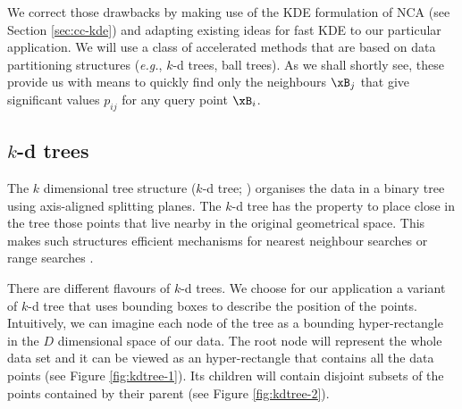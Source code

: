 We correct those drawbacks by making use of the KDE formulation of NCA (see
Section \ref{sec:cc-kde}) and adapting existing ideas for fast KDE
\citep{deng1995,gray2003} to our particular application. We will use a class of
accelerated methods that are based on data partitioning structures
(\textit{e.g.}, $k$-d trees, ball trees). As we shall shortly see, these provide
us with means to quickly find only the neighbours $\xB_j$ that give significant
values $p_{ij}$ for any query point $\xB_i$. 
%

\subsection{$k$-d trees}
\label{subsec:k-d-trees}

The $k$ dimensional tree structure ($k$-d tree; \citealp{bentley1975}) organises
the data in a binary tree using axis-aligned splitting planes. The $k$-d tree
has the property to place close in the tree those points that live nearby in the
original geometrical space. This makes such structures efficient mechanisms for
nearest neighbour searches \citep{friedman1977} or range searches
\citep{moore1991}.

There are different flavours of $k$-d trees. We choose for our application a
variant of $k$-d tree that uses bounding boxes to describe the position of the
points. Intuitively, we can imagine each node of the tree as a bounding
hyper-rectangle in the $D$ dimensional space of our data. The root node will
represent the whole data set and it can be viewed as an hyper-rectangle that
contains all the data points (see Figure \ref{fig:kdtree-1}). Its children will
contain disjoint subsets of the points contained by their parent (see Figure
\ref{fig:kdtree-2}).

